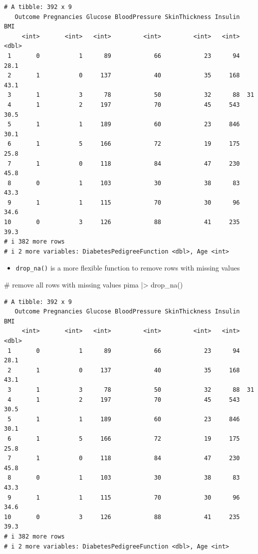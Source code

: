 \documentclass[
  letterpaper,
  DIV=11,
  numbers=noendperiod]{scrreprt}
\newenvironment{Shaded}{\begin{snugshade}}{\end{snugshade}}
\newcommand{\CommentTok}[1]{\textcolor[rgb]{0.37,0.37,0.37}{#1}}
\newcommand{\FunctionTok}[1]{\textcolor[rgb]{0.28,0.35,0.67}{#1}}
\newcommand{\NormalTok}[1]{\textcolor[rgb]{0.00,0.23,0.31}{#1}}
\newcommand{\SpecialCharTok}[1]{\textcolor[rgb]{0.37,0.37,0.37}{#1}}
\providecommand{\tightlist}{%
  \setlength{\itemsep}{0pt}\setlength{\parskip}{0pt}}\usepackage{longtable,booktabs,array}
\begin{document}
\begin{verbatim}
# A tibble: 392 x 9
   Outcome Pregnancies Glucose BloodPressure SkinThickness Insulin   BMI
     <int>       <int>   <int>         <int>         <int>   <int> <dbl>
 1       0           1      89            66            23      94  28.1
 2       1           0     137            40            35     168  43.1
 3       1           3      78            50            32      88  31  
 4       1           2     197            70            45     543  30.5
 5       1           1     189            60            23     846  30.1
 6       1           5     166            72            19     175  25.8
 7       1           0     118            84            47     230  45.8
 8       0           1     103            30            38      83  43.3
 9       1           1     115            70            30      96  34.6
10       0           3     126            88            41     235  39.3
# i 382 more rows
# i 2 more variables: DiabetesPedigreeFunction <dbl>, Age <int>
\end{verbatim}

\begin{itemize}
\tightlist
\item
  \texttt{drop\_na()} is a more flexible function to remove rows with
  missing values
\end{itemize}

\begin{Shaded}
\begin{Highlighting}[]
\CommentTok{\# remove all rows with missing values}
\NormalTok{pima }\SpecialCharTok{|\textgreater{}} \FunctionTok{drop\_na}\NormalTok{()}
\end{Highlighting}
\end{Shaded}

\begin{verbatim}
# A tibble: 392 x 9
   Outcome Pregnancies Glucose BloodPressure SkinThickness Insulin   BMI
     <int>       <int>   <int>         <int>         <int>   <int> <dbl>
 1       0           1      89            66            23      94  28.1
 2       1           0     137            40            35     168  43.1
 3       1           3      78            50            32      88  31  
 4       1           2     197            70            45     543  30.5
 5       1           1     189            60            23     846  30.1
 6       1           5     166            72            19     175  25.8
 7       1           0     118            84            47     230  45.8
 8       0           1     103            30            38      83  43.3
 9       1           1     115            70            30      96  34.6
10       0           3     126            88            41     235  39.3
# i 382 more rows
# i 2 more variables: DiabetesPedigreeFunction <dbl>, Age <int>
\end{verbatim}
\end{document}
